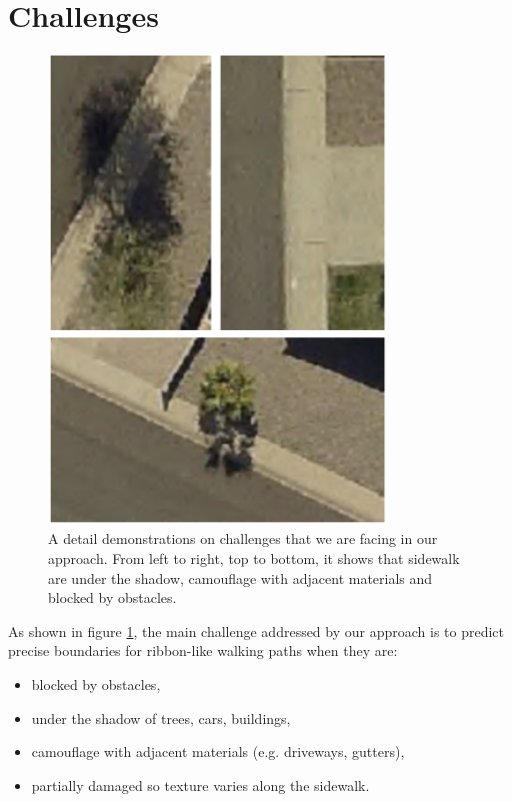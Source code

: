 \section{Challenges}

\begin{figure}[H]
    \centering
    \includegraphics[width=0.8\textwidth]{Figures/challenge.png}
    \caption[Challenges Demonstration]{A detail demonstrations on challenges that we are facing in our approach. From left to right, top to bottom, it shows that sidewalk are under the shadow, camouflage with adjacent materials and blocked by obstacles.}
    \label{fig:challenge_demo}
\end{figure}

As shown in figure \ref{fig:challenge_demo}, the main challenge addressed by our approach is to predict precise boundaries for ribbon-like walking paths when they are:

\begin{itemize}
    \item blocked by obstacles,
    \item under the shadow of trees, cars, buildings,
    \item camouflage with adjacent materials (e.g. driveways, gutters),
    \item partially damaged so texture varies along the sidewalk.
\end{itemize}

